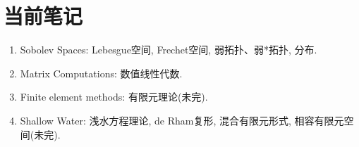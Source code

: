 \documentclass[UTF8,10.5pt,a4paper]{ctexart}
\begin{document}
\section{当前笔记}
\begin{enumerate}
  \item Sobolev Spaces: Lebesgue空间, Frechet空间, 弱拓扑、弱*拓扑, 分布.
  \item Matrix Computations: 数值线性代数.
  \item  Finite element methods: 有限元理论(未完).
  \item Shallow Water: 浅水方程理论, de Rham复形,  混合有限元形式, 相容有限元空间(未完).
\end{enumerate}
\end{document}

